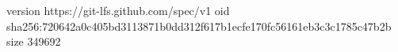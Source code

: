 version https://git-lfs.github.com/spec/v1
oid sha256:720642a0c405bd3113871b0dd312f617b1ecfe170fc56161eb3c3c1785c47b2b
size 349692
